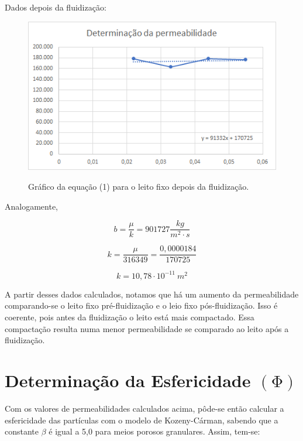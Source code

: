 Dados depois da fluidização:

\begin{figure}[H]
	\begin{center}
		\includegraphics[scale=.8, trim={0 0 0 0}]{figuras/ladeq/fluid/graph5}
		\label{fig7}
		\caption{Gráfico da equação (1) para o leito fixo depois da fluidização.}
	\end{center}
\end{figure}

Analogamente,

\begin{equation}\label{key}
b=\frac{\mu}{k}=901727 \frac{k g}{m^{2} \cdot s}
\end{equation}


\begin{equation}\label{key}
k=\frac{\mu}{316349}=\frac{0,0000184}{170725}
\end{equation}

\begin{equation}\label{key}
k=10,78 \cdot 10^{-11} \ m^{2}
\end{equation}

A partir desses dados calculados, notamos que há um aumento da permeabilidade comparando-se o leito fixo pré-fluidização e o leio fixo pós-fluidização. Isso é coerente, pois antes da fluidização o leito está mais compactado. Essa compactação resulta numa menor permeabilidade se comparado ao leito após a fluidização.

\section{Determinação da Esfericidade $ (\mathrm{\Phi}) $}

Com os valores de permeabilidades calculados acima, pôde-se então calcular a esfericidade das partículas com o modelo de Kozeny-Cárman, sabendo que a constante $ \beta $ é igual a 5,0 para meios porosos granulares. Assim, tem-se:

